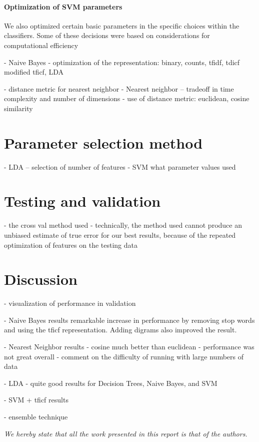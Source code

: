\documentclass[conference,letterpaper]{IEEEtran}
\begin{document}
\paragraph{Optimization of SVM parameters}


We also optimized certain basic parameters in the specific choices within the classifiers.  Some of these 
decisions were based on considerations for computational efficiency

- Naive Bayes 
	- optimization of the representation: binary, counts, tfidf, tdicf
		modified tficf, LDA

- distance metric for nearest neighbor
- Nearest neighbor -- tradeoff in time complexity and number of dimensions
	- use of distance metric: euclidean, cosine similarity

\section{Parameter selection method}
- LDA -- selection of number of features
- SVM what parameter values used



\section{Testing and validation}
- the cross val method used
- technically, the method used cannot produce an unbiased estimate of true
	error for our best results, because of the repeated optimization
	of features on the testing data


\section{Discussion}

- visualization of performance in validation

- Naive Bayes results
	remarkable increase in performance by removing stop words and using the
	tficf representation.  Adding digrams also improved the result.

- Nearest Neighbor results
	- cosine much better than euclidean
	- performance was not great overall
	- comment on the difficulty of running with large numbers of data

- LDA
	- quite good results for Decision Trees, Naive Bayes, and SVM

- SVM + tficf results

- ensemble technique

\begin{center}
	\textit{
		We hereby state that all the work presented in this report is 
		that of the authors.
	}
\end{center}


\end{document}
